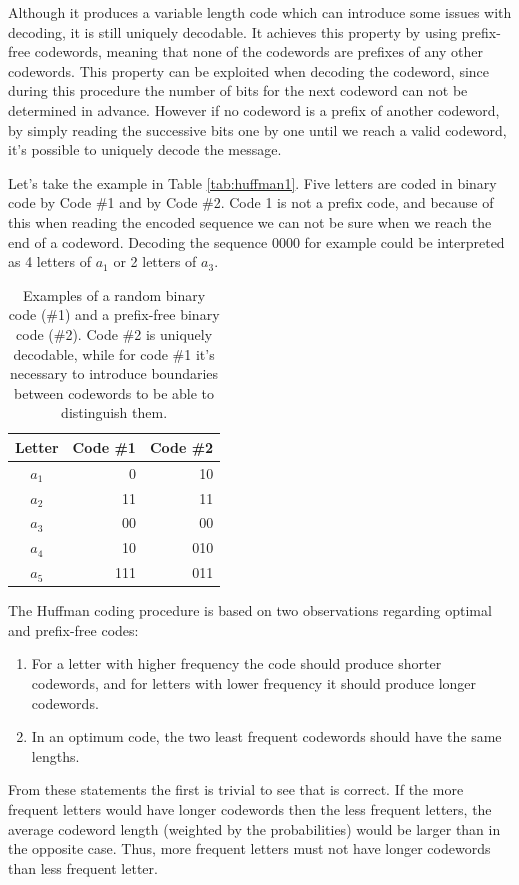 \documentclass{diploma_style}
\begin{document}
Although it produces a variable length code which can introduce some issues with decoding, it is still uniquely decodable. It achieves this property by using prefix-free codewords, meaning that none of the codewords are prefixes of any other codewords. This property can be exploited when decoding the codeword, since during this procedure the number of bits for the next codeword can not be determined in advance. However if no codeword is a prefix of another codeword, by simply reading the successive bits one by one until we reach a valid codeword, it's possible to uniquely decode the message.

Let's take the example in Table \ref{tab:huffman1}. Five letters are coded in binary code by Code \#1 and by Code \#2. Code 1 is not a prefix code, and because of this when reading the encoded sequence we can not be sure when we reach the end of a codeword. Decoding the sequence 0000 for example could be interpreted as 4 letters of $a_1$ or 2 letters of $a_3$.

\begin{table}
\caption{Examples of a random binary code (\#1) and a prefix-free binary code (\#2). Code \#2 is uniquely decodable, while for code \#1 it's necessary to introduce boundaries between codewords to be able to distinguish them.}
\centering
\begin{tabular}{crr}
\toprule
Letter & Code \#1 & Code \#2 \\
\midrule
$a_1$ & 0	& 10 \\
$a_2$ & 11	& 11 \\
$a_3$ & 00	& 00 \\
$a_4$ & 10 	& 010 \\
$a_5$ & 111	& 011 \\
\bottomrule
\end{tabular}
\label{tab:prefix}
\end{table}

The Huffman coding procedure is based on two observations regarding optimal and prefix-free codes:
\begin{enumerate}
\item For a letter with higher frequency the code should produce shorter codewords, and for letters with lower frequency it should produce longer codewords.
\item In an optimum code, the two least frequent codewords should have the same lengths.
\end{enumerate}

From these statements the first is trivial to see that is correct. If the more frequent letters would have longer codewords then the less frequent letters, the average codeword length (weighted by the probabilities) would be larger than in the opposite case. Thus, more frequent letters must not have longer codewords than less frequent letter.
\end{document}
